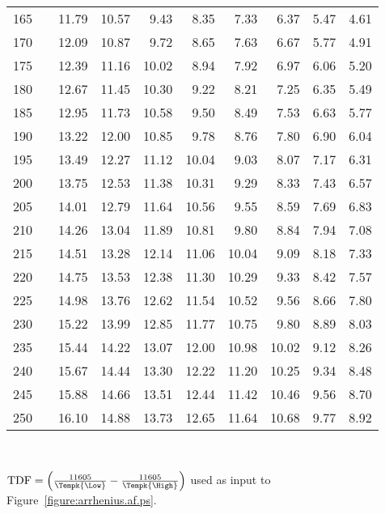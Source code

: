 \begin{table}
\begin{tabular} { crrrrrrrrr}
165 &&  11.79 & 10.57 &  9.43 &  8.35 &  7.33 &  6.37 &  5.47 &  4.61 \\ 
170 &&  12.09 & 10.87&   9.72 &  8.65 &  7.63 &  6.67 &  5.77 &  4.91 \\ 
175 &&  12.39 & 11.16&  10.02 &  8.94 &  7.92 &  6.97 &  6.06 &  5.20 \\ [.5ex]
180 &&  12.67 & 11.45 & 10.30 &  9.22 &  8.21 &  7.25 &  6.35&   5.49 \\ 
185 &&  12.95&  11.73 & 10.58 &  9.50 &  8.49 &  7.53 &  6.63&   5.77 \\ 
190 &&  13.22 & 12.00&  10.85 &  9.78 &  8.76 &  7.80 &  6.90 &  6.04 \\ 
195 &&  13.49&  12.27 & 11.12 & 10.04 &  9.03 &  8.07 &  7.17 &  6.31 \\ 
200 &&  13.75 & 12.53 & 11.38 & 10.31 &  9.29 &  8.33 &  7.43&   6.57 \\ [.5ex]
205&&   14.01&  12.79&  11.64 & 10.56 &  9.55 &  8.59 &  7.69&   6.83 \\ 
210&&   14.26 & 13.04 & 11.89 & 10.81 &  9.80 &  8.84 &  7.94 &  7.08 \\ 
215&&   14.51 & 13.28 & 12.14 & 11.06&  10.04 &  9.09 &  8.18 &  7.33 \\ 
220 &&  14.75 & 13.53 & 12.38 & 11.30 & 10.29 &  9.33 &  8.42 &  7.57 \\ 
225 &&  14.98&  13.76 & 12.62 & 11.54 & 10.52 &  9.56 &  8.66 &  7.80 \\[.5ex] 
230 &&  15.22 & 13.99 & 12.85 & 11.77&  10.75 &  9.80 &  8.89 &  8.03 \\ 
235 &&  15.44&  14.22 & 13.07 & 12.00 & 10.98 & 10.02 &  9.12&   8.26 \\ 
240 &&  15.67 & 14.44 & 13.30 & 12.22&  11.20 & 10.25 &  9.34 &  8.48 \\ 
245 &&  15.88 & 14.66 & 13.51 & 12.44 & 11.42 & 10.46 &  9.56&   8.70 \\ 
250 &&  16.10&  14.88 & 13.73 & 12.65 & 11.64&  10.68 &  9.77 &  8.92 \\ 
 \hline 
\end{tabular} \\ 
\begin{minipage}[t]{4in}
{ $\mbox{TDF}=\left(\frac{11605}
		   {\Tempk{\Low}}
	   -  \frac{11605}
		   {\Tempk{\High}}
	\right )$ used as input to Figure~\ref{figure:arrhenius.af.ps}.}
\end{minipage}
\label{table:arrhenius.temp.diff}
\end{table}
